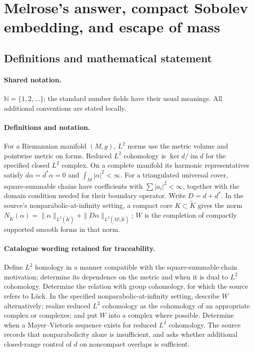 \documentclass[11pt]{article}
\begin{document}
\section{Melrose's answer, compact Sobolev embedding, and escape of mass}\label{statement}

\subsection{Definitions and mathematical statement}

\paragraph{Shared notation.}$\mathbb N=\{1,2,\ldots\}$; the standard number fields have their usual meanings. All additional conventions are stated locally.


\paragraph{Definitions and notation.}For a Riemannian manifold $(M,g)$, $L^2$ norms use the metric volume and pointwise metric on forms. Reduced $L^2$ cohomology is $\ker d/\overline{\operatorname{im}d}$ for the specified closed $L^2$ complex. On a complete manifold its harmonic representatives satisfy $d\alpha=d^*\alpha=0$ and $\int_M|\alpha|^2<\infty$. For a triangulated universal cover, square-summable chains have coefficients with $\sum|a_i|^2<\infty$, together with the domain condition needed for their boundary operator. Write $D=d+d^*$. In the source’s nonparabolic-at-infinity setting, a compact core $K\subset\widetilde K$ gives the norm $N_{\widetilde K}(\alpha)=\|\alpha\|_{L^2(\widetilde K)}+\|D\alpha\|_{L^2(M\setminus\widetilde K)}$; $W$ is the completion of compactly supported smooth forms in that norm.

\paragraph{Catalogue wording retained for traceability.}
Define $L^2$ homology in a manner compatible with the square-summable-chain motivation; determine its dependence on the metric and when it is dual to $L^2$ cohomology. Determine the relation with group cohomology, for which the source refers to Lück. In the specified nonparabolic-at-infinity setting, describe $W$ alternatively; realize reduced $L^2$ cohomology as the cohomology of an appropriate complex or complexes; and put $W$ into a complex where possible. Determine when a Mayer--Vietoris sequence exists for reduced $L^2$ cohomology. The source records that nonparabolicity alone is insufficient, and asks whether additional closed-range control of $d$ on noncompact overlaps is sufficient.
\end{document}
